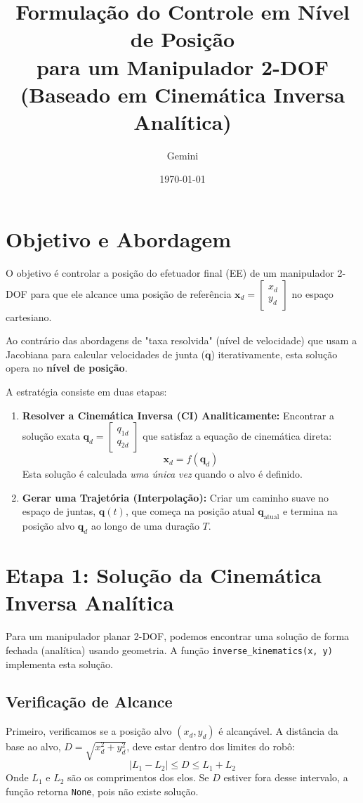 \documentclass[a4paper, 12pt]{article}
\title{Formulação do Controle em Nível de Posição \\
       para um Manipulador 2-DOF \\
       \large (Baseado em Cinemática Inversa Analítica)}
\author{Gemini}
\date{\today}
\begin{document}
\maketitle

\section{Objetivo e Abordagem}
O objetivo é controlar a posição do efetuador final (EE) de um manipulador 2-DOF para que ele alcance uma posição de referência $\mathbf{x}_d = \begin{bmatrix} x_d \\ y_d \end{bmatrix}$ no espaço cartesiano.

Ao contrário das abordagens de "taxa resolvida" (nível de velocidade) que usam a Jacobiana para calcular velocidades de junta ($\dot{\mathbf{q}}$) iterativamente, esta solução opera no \textbf{nível de posição}.

A estratégia consiste em duas etapas:
\begin{enumerate}
    \item \textbf{Resolver a Cinemática Inversa (CI) Analiticamente:} Encontrar a solução exata $\mathbf{q}_d = \begin{bmatrix} q_{1d} \\ q_{2d} \end{bmatrix}$ que satisfaz a equação de cinemática direta:
    \[
    \mathbf{x}_d = f(\mathbf{q}_d)
    \]
    Esta solução é calculada \textit{uma única vez} quando o alvo é definido.
    \item \textbf{Gerar uma Trajetória (Interpolação):} Criar um caminho suave no espaço de juntas, $\mathbf{q}(t)$, que começa na posição atual $\mathbf{q}_{\text{atual}}$ e termina na posição alvo $\mathbf{q}_d$ ao longo de uma duração $T$.
\end{enumerate}

\section{Etapa 1: Solução da Cinemática Inversa Analítica}
Para um manipulador planar 2-DOF, podemos encontrar uma solução de forma fechada (analítica) usando geometria. A função \texttt{inverse\_kinematics(x, y)} implementa esta solução.

\subsection{Verificação de Alcance}
Primeiro, verificamos se a posição alvo $(x_d, y_d)$ é alcançável. A distância da base ao alvo, $D = \sqrt{x_d^2 + y_d^2}$, deve estar dentro dos limites do robô:
\[
|L_1 - L_2| \le D \le L_1 + L_2
\]
Onde $L_1$ e $L_2$ são os comprimentos dos elos. Se $D$ estiver fora desse intervalo, a função retorna \texttt{None}, pois não existe solução.
\end{document}
